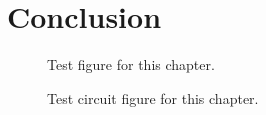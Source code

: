 \chapter{Conclusion}\label{chp:conclusion}
\begin{figure}[htbp]
    \centering
    
    \caption{Test figure for this chapter.}
\end{figure}
\begin{figure}[htbp]
    \centering
    
    \caption{Test circuit figure for this chapter.}
\end{figure}

